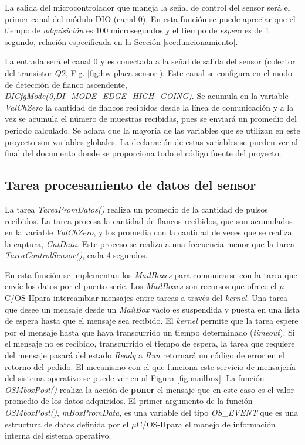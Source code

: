 \documentclass[11pt,a4paper,oneside]{article}
\def\uCOS{$\mu$C/OS-II\texttrademark}
\begin{document}
La salida del microcontrolador que maneja la señal de control del sensor será el primer canal del módulo DIO (canal 0). En esta función se puede apreciar que el tiempo de \emph{adquisición} es 100 microsegundos y el tiempo de \emph{espera} es de 1 segundo, relación especificada en la Sección \ref{sec:funcionamiento}. 

La entrada será el canal 0 y es conectada a la señal de salida del sensor (colector del transistor $Q2$, Fig. \ref{fig:hw-placa-sensor}). Este canal se configura en el modo de detección de flanco ascendente, \emph{DICfgMode(0,DI\_MODE\_EDGE\_HIGH\_GOING)}. Se acumula en la variable \emph{ValChZero} la cantidad de flancos recibidos desde la línea de comunicación y a la vez se acumula el número de muestras recibidas, pues se enviará un promedio del periodo calculado.  Se aclara que la mayoría de las variables que se utilizan en este proyecto son variables globales. La declaración de estas variables se pueden ver al final del documento donde se proporciona todo el código fuente del proyecto.

\subsection{Tarea procesamiento de datos del sensor}
\label{sec:tarea-proces-datos}

La tarea \emph{TareaPromDatos()} realiza un promedio de la cantidad de pulsos recibidos. La tarea procesa la cantidad de flancos recibidos, que son acumulados en la variable \emph{ValChZero}, y los promedia con la cantidad de veces que se realiza la captura, \emph{CntData}. Este proceso se realiza a una frecuencia menor que la tarea \emph{TareaControlSensor()}, cada 4 segundos. 

En esta función se implementan los \emph{MailBoxes} para comunicarse con la tarea que envíe los datos por el puerto serie. Los \emph{MailBoxes} son recursos que ofrece el \uCOS para intercambiar mensajes entre tareas a través del \textsl{kernel}. Una tarea que desee un mensaje desde un \emph{MailBox} vacío es suspendida y puesta en una lista de espera hasta que el mensaje sea recibido. El \textsl{kernel} permite que la tarea espere por el mensaje hasta que haya transcurrido un tiempo determinado (\textsl{timeout}). Si el mensaje no es recibido, transcurrido el tiempo de espera, la tarea que requiere del mensaje  pasará del estado \emph{Ready} a \emph{Run} retornará un código de error en el retorno del pedido. El mecanismo con el que funciona este servicio de mensajería del sistema operativo se puede ver en al Figura \ref{fig:mailbox}. La función \emph{OSMboxPost()} realiza la acción de \textbf{poner} el mensaje que en este caso es el valor promedio de los datos adquiridos. El primer argumento de la función \emph{OSMboxPost()}, \emph{mBoxPromData}, es una variable del tipo \emph{OS\_EVENT} que es una estructura de datos definida por el \uCOS para el manejo de información interna del sistema operativo. 
\end{document}
